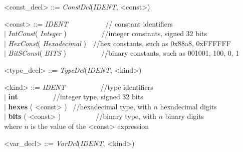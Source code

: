 \documentclass{article}
\begin{document}
\begin{grammar} \small

{\renewcommand\baselinestretch{0}\selectfont
<const\_decl>   ::=  \textit{ConstDcl}(\textit{IDENT}, <const>)

<const>     ::=   \emph{IDENT} ~~~~~~~~~~// constant identifiers  \\
     \hspace*{0.65cm} $\mid$  \textit{IntConst}( \emph{Integer} )~~~~~~~~~~//integer constants, signed 32 bits \\
     \hspace*{0.65cm} $\mid$  \textit{HexConst}( \emph{Hexadecimal} )~~//hex constants, such as 0x88a8, 0xFFFFFF \\
     \hspace*{0.65cm} $\mid$  \textit{BitSConst}( \emph{BITS} )~~~~~~~~~~//binary constants, such as 001001, 100, 0, 1

\par}

\end{grammar}

\begin{grammar} \small

{\renewcommand\baselinestretch{0}\selectfont

<type\_decl>   ::=  \textit{TypeDcl}(\textit{IDENT}, <kind>)

<kind>     ::=   \emph{IDENT}~~~~~~~~~~//type identifiers  \\
     \hspace*{0.56cm} $\mid$  \textbf{int}~~~~~~~~~~//integer type, signed 32 bits \\
     \hspace*{0.56cm} $\mid$  \textbf{hexes} ( <const> )~ //hexadecimal type, with $n$ hexadecimal digits\\
     \hspace*{0.56cm} $\mid$  \textbf{bits} ( <const> )~~~~~~~~~~//binary type, with $n$  binary digits \\
     \hspace*{0.5cm}where $n$ is the value of the <const> expression

\par}

\end{grammar}

\begin{grammar} \small

{\renewcommand\baselinestretch{0}\selectfont

<var\_decl>     ::=   \textit{VarDcl}(\textit{IDENT}, <kind>)

\par}

\end{grammar}
\end{document}
